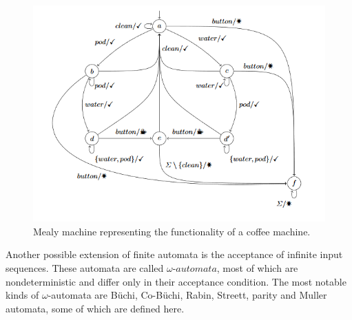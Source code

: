 \begin{figure}[!ht]
	\centering
	\includegraphics[width=0.7\linewidth]{figures/coffeemealy}
	\caption{Mealy machine representing the functionality of a coffee machine.\cite{Steffen2011}}
	\label{fig:coffeemealy}
\end{figure}

Another possible extension of finite automata is the acceptance of infinite input sequences. These automata are called $\omega$-$automata$, most of which are nondeterministic and differ only in their acceptance condition. The most notable kinds of $\omega$-automata are Büchi, Co-Büchi, Rabin, Streett, parity and Muller automata, some of which are defined here. 

